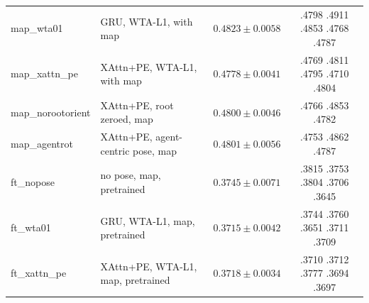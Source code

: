 \documentclass{article} %
\begin{document}
\begin{table}[h]
\begin{center}
\begin{tabular}{llcc}
map\_wta01  & GRU, WTA-L1, with map           & $0.4823 \pm 0.0058$ & .4798 .4911 .4853 .4768 .4787 \\
map\_xattn\_pe & XAttn+PE, WTA-L1, with map    & $0.4778 \pm 0.0041$ & .4769 .4811 .4795 .4710 .4804 \\
map\_norootorient & XAttn+PE, root zeroed, map & $0.4800 \pm 0.0046$ & .4766 .4853 .4782 \\
map\_agentrot & XAttn+PE, agent-centric pose, map & $0.4801 \pm 0.0056$ & .4753 .4862 .4787 \\
\midrule
ft\_nopose  & no pose, map, pretrained        & $0.3745 \pm 0.0071$ & .3815 .3753 .3804 .3706 .3645 \\
ft\_wta01   & GRU, WTA-L1, map, pretrained    & $0.3715 \pm 0.0042$ & .3744 .3760 .3651 .3711 .3709 \\
ft\_xattn\_pe & XAttn+PE, WTA-L1, map, pretrained & $0.3718 \pm 0.0034$ & .3710 .3712 .3777 .3694 .3697 \\
\bottomrule
\end{tabular}
\end{center}
\end{table}
\end{document}

